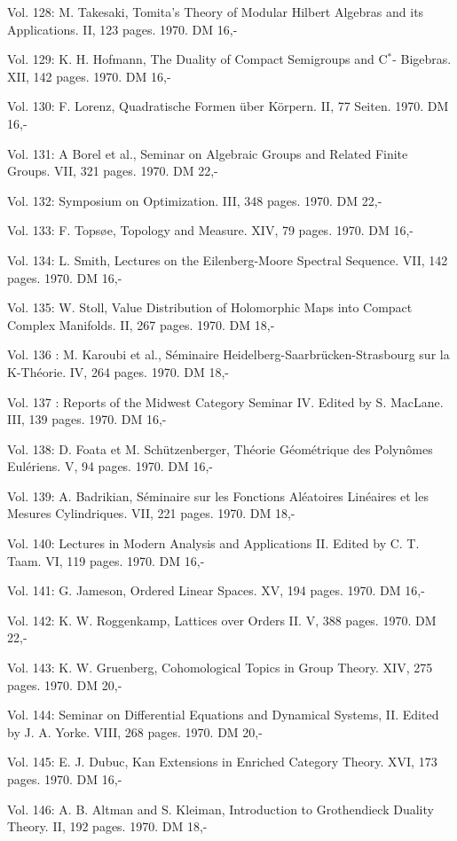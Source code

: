 Vol. 128: M. Takesaki, Tomita's Theory of Modular Hilbert Algebras and its Applications. II, 123 pages. 1970. DM 16,-

Vol. 129: K. H. Hofmann, The Duality of Compact Semigroups and C$^*$- Bigebras. XII, 142 pages. 1970. DM 16,-

Vol. 130: F. Lorenz, Quadratische Formen über Körpern. II, 77 Seiten. 1970. DM 16,-

Vol. 131: A Borel et al., Seminar on Algebraic Groups and Related Finite Groups. VII, 321 pages. 1970. DM 22,-

Vol. 132: Symposium on Optimization. III, 348 pages. 1970. DM 22,-

Vol. 133: F. Topsøe, Topology and Measure. XIV, 79 pages. 1970. DM 16,-

Vol. 134: L. Smith, Lectures on the Eilenberg-Moore Spectral Sequence. VII, 142 pages. 1970. DM 16,-

Vol. 135: W. Stoll, Value Distribution of Holomorphic Maps into Compact Complex Manifolds. II, 267 pages. 1970. DM 18,-

Vol. 136 : M. Karoubi et al., Séminaire Heidelberg-Saarbrücken-Strasbourg sur la K-Théorie. IV, 264 pages. 1970. DM 18,-

Vol. 137 : Reports of the Midwest Category Seminar IV. Edited by S. MacLane. III, 139 pages. 1970. DM 16,-

Vol. 138: D. Foata et M. Schützenberger, Théorie Géométrique des Polynômes Eulériens. V, 94 pages. 1970. DM 16,-

Vol. 139: A. Badrikian, Séminaire sur les Fonctions Aléatoires Linéaires et les Mesures Cylindriques. VII, 221 pages. 1970. DM 18,-

Vol. 140: Lectures in Modern Analysis and Applications II. Edited by C. T. Taam. VI, 119 pages. 1970. DM 16,-

Vol. 141: G. Jameson, Ordered Linear Spaces. XV, 194 pages. 1970. DM 16,-

Vol. 142: K. W. Roggenkamp, Lattices over Orders II. V, 388 pages. 1970. DM 22,-

Vol. 143: K. W. Gruenberg, Cohomological Topics in Group Theory. XIV, 275 pages. 1970. DM 20,-

Vol. 144: Seminar on Differential Equations and Dynamical Systems, II. Edited by J. A. Yorke. VIII, 268 pages. 1970. DM 20,-

Vol. 145: E. J. Dubuc, Kan Extensions in Enriched Category Theory. XVI, 173 pages. 1970. DM 16,-

Vol. 146: A. B. Altman and S. Kleiman, Introduction to Grothendieck Duality Theory. II, 192 pages. 1970. DM 18,-

